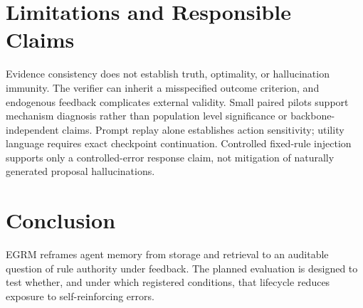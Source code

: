 \documentclass[sigconf,anonymous,review]{acmart}
\begin{document}
\section{Limitations and Responsible Claims}
Evidence consistency does not establish truth, optimality, or hallucination
immunity. The verifier can inherit a misspecified outcome criterion, and
endogenous feedback complicates external validity. Small paired pilots support
mechanism diagnosis rather than population level significance or
backbone-independent claims. Prompt replay alone establishes action sensitivity;
utility language requires exact checkpoint continuation. Controlled fixed-rule
injection supports only a controlled-error response claim, not mitigation of
naturally generated proposal hallucinations.

\section{Conclusion}
EGRM reframes agent memory from storage and retrieval to an auditable question
of rule authority under feedback. The planned evaluation is designed to test
whether, and under which registered conditions, that lifecycle reduces exposure
to self-reinforcing errors.



\end{document}
